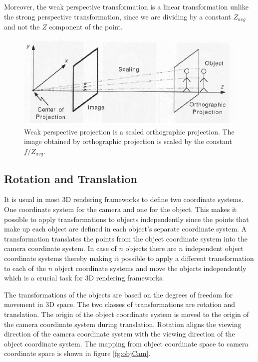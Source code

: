 \documentclass[11pt,a4paper]{report}
\begin{document}
Moreover, the weak perspective transformation is a linear
transformation unlike the strong perspective transformation, since we are
dividing by a constant $Z_{avg}$ and not the $Z$ component of the
point.

\begin{figure}[H] 
\centering
\includegraphics[scale=0.75]{images/weak_persp.png}
\caption{Weak perspective projection is a scaled orthographic projection. The
  image obtained by orthographic projection is scaled by the constant $f/Z_{avg}$.}
\label{fg:weakOrtho}
\end{figure}
  

\subsection{Rotation and Translation}
It is usual in most 3D rendering frameworks to define two coordinate systems. One
coordinate system for the camera and one for the object. This makes it possible
to apply transformations to objects independently since the points that make up each object are defined
in each object's separate coordinate system. A transformation translates the points
from the object coordinate system into the camera coordinate system. In case of $n$ objects there are $n$
independent object coordinate systems thereby making it possible to apply a
different transformation to each of the $n$ object coordinate systems and move
the objects independently which is a crucial task for 3D rendering frameworks.

The transformations of the objects are based on the degrees of freedom for
movement in 3D space. The two classes of transformations are rotation and
translation. The origin of the object coordinate system is moved to the origin
of the camera coordinate system during translation. Rotation aligns the viewing direction
of the camera coordinate system with the viewing direction of the object coordinate
system. The mapping from object coordinate space to camera coordinate space
is shown in figure \ref{fg:objCam}.
\end{document}
